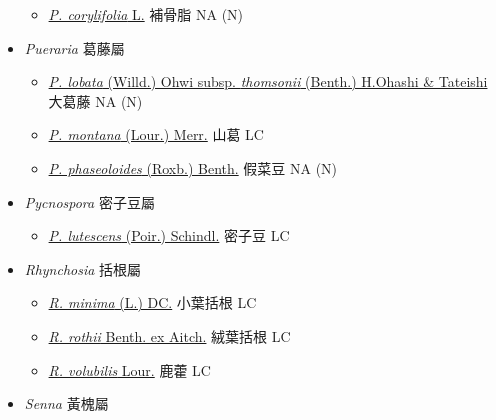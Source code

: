 \begin{itemize}
  \begin{itemize}
        \item[] \href{http://www.theplantlist.org/tpl1.1/search?q=Psoralea+corylifolia}{\textit{P. corylifolia} L.}   補骨脂   NA (N)
  \end{itemize}
 \item[] \textit{Pueraria} 葛藤屬
                                
  \begin{itemize}
        \item[] \href{http://www.theplantlist.org/tpl1.1/search?q=Pueraria+lobata+subsp.+thomsonii}{\textit{P. lobata} (Willd.) Ohwi subsp. \textit{thomsonii} (Benth.) H.Ohashi \& Tateishi}   大葛藤   NA (N)
        \item[] \href{http://www.theplantlist.org/tpl1.1/search?q=Pueraria+montana}{\textit{P. montana} (Lour.) Merr.}   山葛   LC
        \item[] \href{http://www.theplantlist.org/tpl1.1/search?q=Pueraria+phaseoloides}{\textit{P. phaseoloides} (Roxb.) Benth.}   假菜豆   NA (N)
  \end{itemize}
 \item[] \textit{Pycnospora} 密子豆屬
                                
  \begin{itemize}
        \item[] \href{http://www.theplantlist.org/tpl1.1/search?q=Pycnospora+lutescens}{\textit{P. lutescens} (Poir.) Schindl.}   密子豆   LC
  \end{itemize}
 \item[] \textit{Rhynchosia} 括根屬
                                
  \begin{itemize}
        \item[] \href{http://www.theplantlist.org/tpl1.1/search?q=Rhynchosia+minima}{\textit{R. minima} (L.) DC.}   小葉括根   LC
        \item[] \href{http://www.theplantlist.org/tpl1.1/search?q=Rhynchosia+rothii}{\textit{R. rothii} Benth. ex Aitch.}   絨葉括根   LC
        \item[] \href{http://www.theplantlist.org/tpl1.1/search?q=Rhynchosia+volubilis}{\textit{R. volubilis} Lour.}   鹿藿   LC
  \end{itemize}
 \item[] \textit{Senna} 黃槐屬
                                

\end{itemize}
